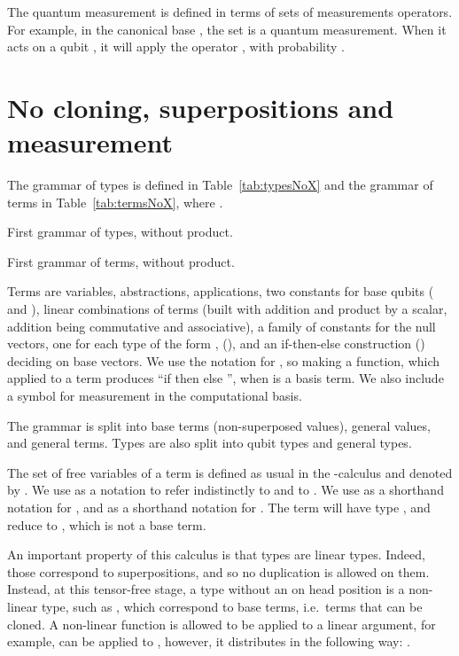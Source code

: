 \documentclass[preprint]{elsarticle}
\begin{document}

The quantum measurement is defined in terms of sets of measurements operators.
For example, in the canonical base , the set  is
a quantum measurement. When it acts on a qubit , it will apply the
operator , with probability .
\section{No cloning, superpositions and measurement}\label{sec:calculus}
\label{sec:fstGram}\label{sec:fstTS}\label{sec:fstTRS}


The grammar of types is defined in Table~\ref{tab:typesNoX} and the grammar of
terms in Table~\ref{tab:termsNoX}, where .

\begin{table}
  \centering
  
  \caption{First grammar of types, without product.}
  \label{tab:typesNoX}
\end{table}

\begin{table}
  \centering
  
  \caption{First grammar of terms, without product.}
  \label{tab:termsNoX}
\end{table}


Terms are variables, abstractions, applications, two constants for base qubits
( and ), linear combinations of terms (built with addition and
product by a scalar, addition being commutative and associative), a family of
constants for the null vectors, one for each type of the form , (),
and an if-then-else construction () deciding on base vectors. We use
the notation  for , so making  a function, which applied to a term  produces ``if  then  else '', when  is a basis term. We also include a symbol  for
measurement in the computational basis.

The grammar is split into base terms (non-superposed values), general values,
and general terms. Types are also split into qubit types and general types.

The set of free variables of a term  is defined as usual in the
-calculus and denoted by . We use  as a notation to
refer indistinctly to  and to . We use  as a shorthand notation
for , and  as a shorthand notation for . The term
 will have type , and reduce to , which is not a base term.

An important property of this calculus is that types  are linear
types. Indeed, those correspond to superpositions, and so no duplication is
allowed on them. Instead, at this tensor-free stage, a type without an
 on head position is a non-linear type, such as , which correspond
to base terms, i.e.~terms that can be cloned. A non-linear function is allowed
to be applied to a linear argument, for example,  can be
applied to , however,
it distributes in the following way: .
\end{document}
